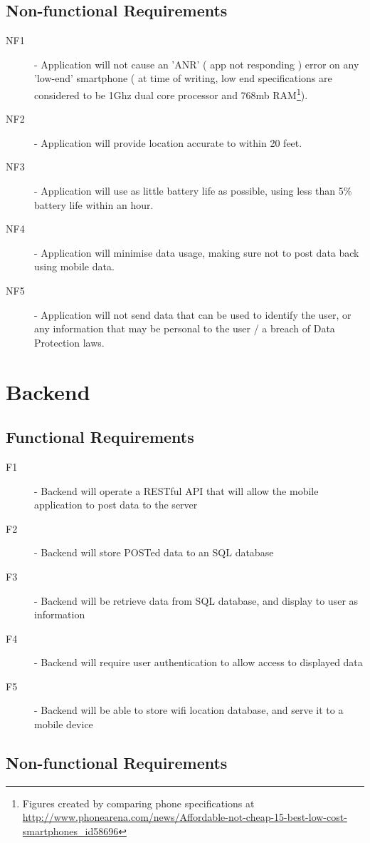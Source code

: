 \documentclass[11pt]{informatics-report}
\begin{document}
\subsection{Non-functional Requirements}
\begin{description}
\item[NF1] - Application will not cause an 'ANR' ( app not responding ) error on any 'low-end' smartphone ( at time of writing, low end specifications are considered to be 1Ghz dual core processor and 768mb RAM\footnote{Figures created by comparing phone specifications at \url{http://www.phonearena.com/news/Affordable-not-cheap-15-best-low-cost-smartphones_id58696}}).
\item[NF2] - Application will provide location accurate to within 20 feet.
\item[NF3] - Application will use as little battery life as possible, using less than 5\% battery life within an hour.
\item[NF4] - Application will minimise data usage, making sure not to post data back using mobile data.
\item[NF5] - Application will not send data that can be used to identify the user, or any information that may be personal to the user / a breach of Data Protection laws.
\end{description}

\section{Backend}
\subsection{Functional Requirements}
\begin{description}
\item[F1] - Backend will operate a RESTful API that will allow the mobile application to post data to the server
\item[F2] - Backend will store POSTed data to an SQL database
\item[F3] - Backend will be retrieve data from SQL database, and display to user as information
\item[F4] - Backend will require user authentication to allow access to displayed data
\item[F5] - Backend will be able to store wifi location database, and serve it to a mobile device
\end{description}

\subsection{Non-functional Requirements}
\end{document}
